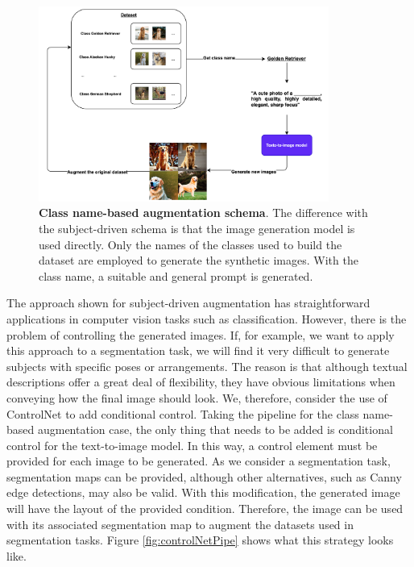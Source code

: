 \begin{figure}
    \centering
    \includegraphics[width=0.85\textwidth]{Pictures/controlNetP.png} 
    \caption{\textbf{Class name-based augmentation schema}. The difference with the subject-driven schema is that the image generation model is used directly. Only the names of the classes used to build the dataset are employed to generate the synthetic images. With the class name, a suitable and general prompt is generated.}
    \label{fig:controlNetP}
\end{figure}

The approach shown for subject-driven augmentation has straightforward applications in computer vision tasks such as classification. However, there is the problem of controlling the generated images. If, for example, we want to apply this approach to a segmentation task, we will find it very difficult to generate subjects with specific poses or arrangements. The reason is that although textual descriptions offer a great deal of flexibility, they have obvious limitations when conveying how the final image should look. We, therefore, consider the use of ControlNet to add conditional control. Taking the pipeline for the class name-based augmentation case, the only thing that needs to be added is conditional control for the text-to-image model. In this way, a control element must be provided for each image to be generated. As we consider a segmentation task, segmentation maps can be provided, although other alternatives, such as Canny edge detections, may also be valid. With this modification, the generated image will have the layout of the provided condition. Therefore, the image can be used with its associated segmentation map to augment the datasets used in segmentation tasks. Figure \ref{fig:controlNetPipe} shows what this strategy looks like.

